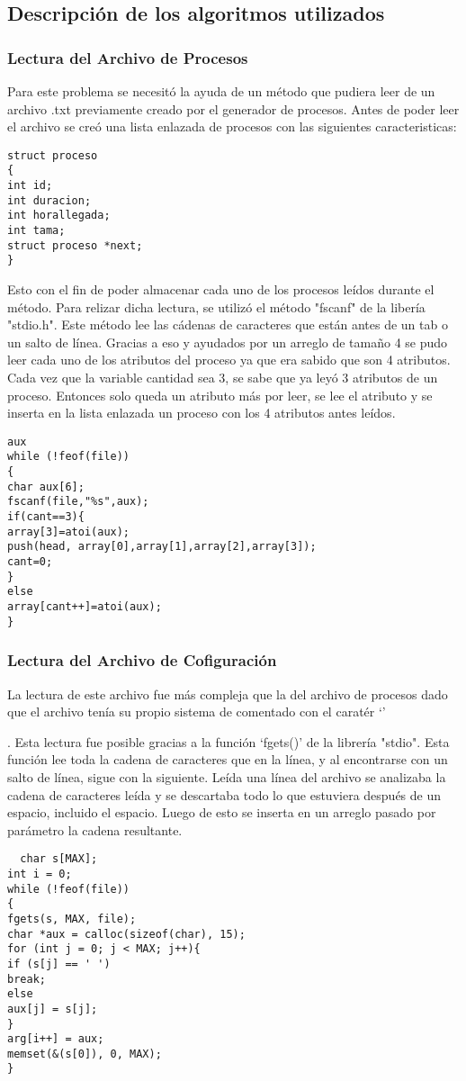 \documentclass[10pt,a4paper]{article}
\begin{document}
\subsection{Descripción de los algoritmos utilizados}
\subsubsection{Lectura del Archivo de Procesos}
Para este problema se necesitó la ayuda de un método que pudiera leer de un archivo .txt previamente creado por el generador de procesos.
Antes de poder leer el archivo se creó una lista enlazada de procesos con las siguientes caracteristicas:
\begin{verbatim}
struct proceso
{
int id;
int duracion;
int horallegada;
int tama;
struct proceso *next;
} 
\end{verbatim}
Esto con el fin de poder almacenar cada uno de los procesos leídos durante el método.
Para relizar dicha lectura, se utilizó el método "fscanf" de la libería "stdio.h".
Este método lee las cádenas de caracteres que están antes de un tab o un salto de línea. 
Gracias a eso y ayudados por un arreglo de tamaño 4 se pudo leer cada uno de los atributos del proceso ya que era sabido que son 4 atributos. Cada vez que la variable cantidad sea 3, se sabe que ya leyó 3 atributos de un proceso. Entonces solo queda un atributo más por leer, se lee el atributo y se inserta en la lista enlazada un proceso con los 4 atributos antes leídos.
  
\begin{verbatim}
aux
while (!feof(file))
{
char aux[6];
fscanf(file,"%s",aux);
if(cant==3){
array[3]=atoi(aux);
push(head, array[0],array[1],array[2],array[3]);
cant=0;
}
else
array[cant++]=atoi(aux);    
} 
\end{verbatim}

\subsubsection{Lectura del Archivo de Cofiguración}
La lectura de este archivo fue más compleja que la del archivo de procesos dado que el archivo tenía su propio sistema de comentado con el caratér `'

.
Esta lectura fue posible gracias a la función `fgets()' de la librería "stdio".
Esta función lee toda la cadena de caracteres que en la línea, y al encontrarse con un salto de línea, sigue con la siguiente.
Leída una línea del archivo se analizaba la cadena de caracteres leída y se descartaba todo lo que estuviera después de un espacio, incluido el espacio.
Luego de esto se inserta en un arreglo pasado por parámetro la cadena resultante.
\begin{verbatim}
  char s[MAX];
int i = 0;
while (!feof(file))
{
fgets(s, MAX, file);
char *aux = calloc(sizeof(char), 15);
for (int j = 0; j < MAX; j++){
if (s[j] == ' ')
break;
else
aux[j] = s[j];
}
arg[i++] = aux;
memset(&(s[0]), 0, MAX);
}
\end{verbatim}
\end{document}
